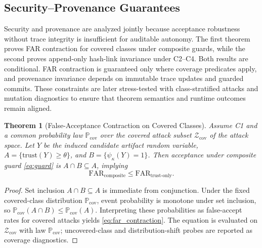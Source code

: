 \documentclass{article} %
\newtheorem{theorem}{Theorem}[section]
\begin{document}
\subsection{Security--Provenance Guarantees}
Security and provenance are analyzed jointly because acceptance robustness without trace integrity is insufficient for auditable autonomy. The first theorem proves FAR contraction for covered classes under composite guards, while the second proves append-only hash-link invariance under C2--C4.
Both results are conditional. FAR contraction is guaranteed only where coverage predicates apply, and provenance invariance depends on immutable trace updates and guarded commits. These constraints are later stress-tested with class-stratified attacks and mutation diagnostics to ensure that theorem semantics and runtime outcomes remain aligned.
\begin{theorem}[False-Acceptance Contraction on Covered Classes]
\label{thm:far_contraction}
Assume C1 and a common probability law $\mathbb{P}_{\mathrm{cov}}$ over the covered attack subset $\mathcal{Z}_{\mathrm{cov}}$ of the attack space. Let $Y$ be the induced candidate artifact random variable, $A=\{\mathrm{trust}(Y)\ge\theta\}$, and $B=\{\psi_{\kappa}(Y)=1\}$. Then acceptance under composite guard \eqref{eq:guard} is $A\cap B \subseteq A$, implying
\begin{equation}
\mathrm{FAR}_{\mathrm{composite}} \le \mathrm{FAR}_{\mathrm{trust\text{-}only}}.
\label{eq:far_contraction}
\end{equation}
\end{theorem}
\begin{proof}
Set inclusion $A\cap B\subseteq A$ is immediate from conjunction. Under the fixed covered-class distribution $\mathbb{P}_{\mathrm{cov}}$, event probability is monotone under set inclusion, so $\mathbb{P}_{\mathrm{cov}}(A\cap B)\le\mathbb{P}_{\mathrm{cov}}(A)$. Interpreting these probabilities as false-accept rates for covered attacks yields \eqref{eq:far_contraction}. The equation is evaluated on $\mathcal{Z}_{\mathrm{cov}}$ with law $\mathbb{P}_{\mathrm{cov}}$; uncovered-class and distribution-shift probes are reported as coverage diagnostics.\qedhere
\end{proof}
\end{document}
